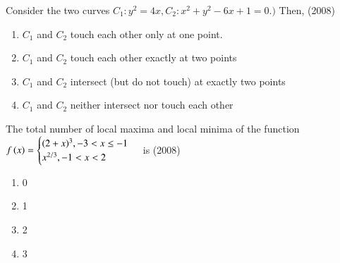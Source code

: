 \documentclass[journal,12pt,twocolumn]{IEEEtran}
\theoremstyle{remark}
\begin{document}

   
      \item
	      Consider the two curves $C_{1}:y^2=4x,$$C_{2}:x^2+y^2-6x+1=0.)$ Then,  \hfill(2008)
     \begin{enumerate}
      \item $C_{1}$ and $C_{2}$ touch each other only at one point.
    
      \item $C_{1}$ and $C_{2}$ touch each other exactly at two points

      \item $C_{1}$ and $C_{2}$ intersect (but do not touch) at exactly two points

      \item $C_{1}$ and $C_{2}$ neither intersect nor touch each other \\
     
    \end{enumerate}
 
    \item 
    The total number of local maxima and local minima of the function \\
   
   $ f\left(x\right)=\begin{cases} 
   (2+x)^3, -3<x\le -1\\
   x^{2/3} ,-1<x<2
   \end{cases}$ is
   \hfill(2008)
    \begin{enumerate}
     \item 0 
     \item 1
     \item 2 
     \item 3 \\
    \end{enumerate}   
\end{document}
